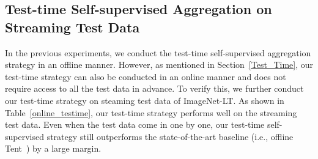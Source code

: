 \documentclass{article}
\begin{document}
\clearpage

\subsection{Test-time Self-supervised Aggregation on Streaming Test Data} 
In the previous experiments, we conduct the test-time self-supervised aggregation strategy in an offline manner. However, as mentioned in Section~\ref{Test_Time}, our test-time strategy can also be conducted in an online manner and does not require access to all the test data in advance. To verify this, we further conduct our test-time strategy on steaming test data of ImageNet-LT.
As shown in Table~\ref{online_testime}, our test-time strategy performs well on the streaming test data. Even when the test data come in one by one, our test-time self-supervised strategy still outperforms the state-of-the-art baseline (i.e., offline Tent~\cite{wang2021tent})  by a large margin.   
 
\begin{table}[H]   
	\caption{Results of our test-time self-supervised aggregation strategy on streaming test data of ImageNet-LT, where all test-time strategies are used on the same  skill-diverse multi-expert model.  } 
	\label{online_testime} 
 \begin{center}
 \begin{threeparttable} 
	 \end{threeparttable}
	 \end{center}  
\end{table}
\end{document}
